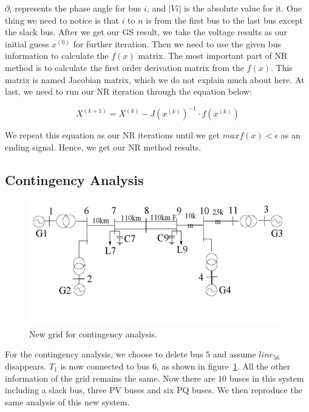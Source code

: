 \documentclass[conference]{IEEEtran}
\begin{document}
$\partial_i$ represents the phase angle for bus $i$, and $|Vi|$ is the absolute value for it. One thing we need to notice is that $i$ to $n$ is from the first bus to the last bus except the slack bus. After we get our GS result, we take the voltage results as our initial guess $x^{(0)}$ for further iteration. Then we need to use the given bus information to calculate the $f(x)$ matrix. The most important part of NR method is to calculate the first order derivation matrix from the $f(x)$. This matrix is named Jacobian matrix, which we do not explain much about here. At last, we need to run our NR iteration through the equation below:

\begin{equation}
	X^{(k+1)}=X^{(k)}-J(x^{(k)})^{-1}\cdot f(x^{(k)})
\end{equation}

We repeat this equation as our NR iterations until we get $max{f(x)}<\epsilon$ as an ending signal. Hence, we get our NR method results.

\subsection{Contingency Analysis}

\begin{figure}[tp]
	\centering
	\includegraphics[width=1.25\columnwidth, clip=true]{grid2.png}
	\vspace{-10mm}
	\caption{New grid for contingency analysis.}
	\label{fig:grid2}
	\vspace{-1.5mm}
\end{figure}

For the contingency analysis, we choose to delete bus $5$ and assume $line_{56}$ disappears. $T_1$ is now connected to bus $6$, as shown in figure~\ref{fig:grid2}. All the other information of the grid remains the same. Now there are $10$ buses in this system including a slack bus, three PV buses and six PQ buses. We then reproduce the same analysis of this new system.
\end{document}
